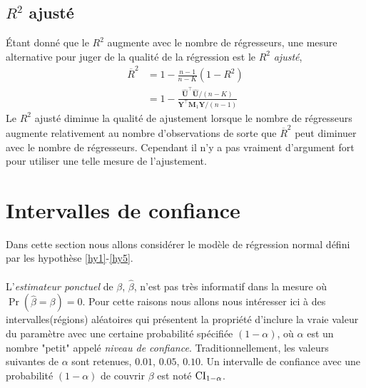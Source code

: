 \subsection{$R^2$ ajusté}
\'Etant donné que le $R^2$ augmente avec le nombre de régresseurs, une mesure alternative pour juger de la qualité de la régression est le $R^2$ \emph{ajusté},
\begin{align*}
\overline{R}^2 &= 1 - \frac{n-1}{n-K}(1 - R^2)\\
& = 1 - \frac{\widehat{\mathbf{U}}^\top\widehat{\mathbf{U}}/(n-K)}{\mathbf{Y}^\top\mathbf{M}_1\mathbf{Y}/(n-1)}
\end{align*}
Le $R^2$ ajusté diminue la qualité de ajustement lorsque le nombre de régresseurs augmente relativement au nombre d'observations de sorte que $\overline{R}^2 $ peut diminuer avec le nombre de régresseurs. Cependant il n'y a pas vraiment d'argument fort pour utiliser une telle mesure de l'ajustement.

\newpage
\section{Intervalles de confiance}

Dans cette section nous allons considérer le modèle de régression normal défini par les hypothèse \ref{hy1}-\ref{hy5}.\\\\
L'\emph{estimateur ponctuel} de $\beta$, $\widehat{\beta}$, n'est pas très informatif dans la mesure où $\Pr(\widehat{\beta}=\beta)=0$. Pour cette raisons nous allons nous intéresser ici à des intervalles(régions) aléatoires qui présentent la propriété d'inclure la vraie valeur du paramètre avec une certaine probabilité spécifiée $(1-\alpha)$, où $\alpha$ est un nombre "petit" appelé \emph{niveau de confiance}. Traditionnellement, les valeurs suivantes de $\alpha$ sont retenues, $0.01$, $0.05$, $0.10$. Un intervalle de confiance avec une probabilité  $(1-\alpha)$ de couvrir $\beta$ est noté $\mathrm{CI}_{1-\alpha}$.

